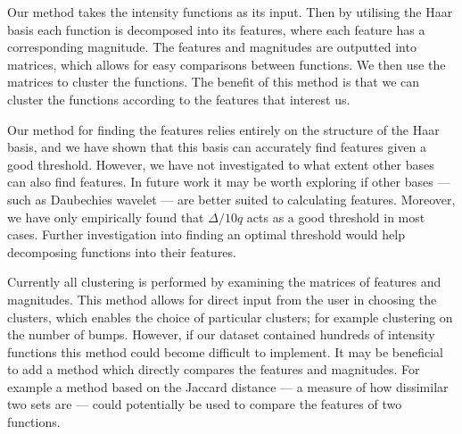 \documentclass[../main.tex]{subfiles}
\begin{document}
Our method takes the intensity functions as its input. Then by utilising the Haar basis each function is decomposed into its features, where each feature has a corresponding magnitude. The features and magnitudes are outputted into matrices, which allows for easy comparisons between functions. We then use the matrices to cluster the functions. The benefit of this method is that we can cluster the functions according to the features that interest us.
 
Our method for finding the features relies entirely on the structure of the Haar basis, and we have shown that this basis can accurately find features given a good threshold. However, we have not investigated to what extent other bases can also find features. In future work it may be worth exploring if other bases --- such as Daubechies wavelet --- are better suited to calculating features. Moreover, we have only empirically found that $\Delta/10q$ acts as a good threshold in most cases. Further investigation into finding an optimal threshold would help decomposing functions into their features. 

Currently all clustering is performed by examining the matrices of features and  magnitudes. This method allows for direct input from the user in choosing the clusters, which enables the choice of particular clusters; for example clustering on the number of bumps. However, if our dataset contained hundreds of intensity functions this method could become difficult to implement. It may be beneficial to add a method which directly compares the features and magnitudes. For example a method based on the Jaccard distance --- a measure of how dissimilar two sets are --- could potentially be used to compare the features of two functions. 
\end{document}
